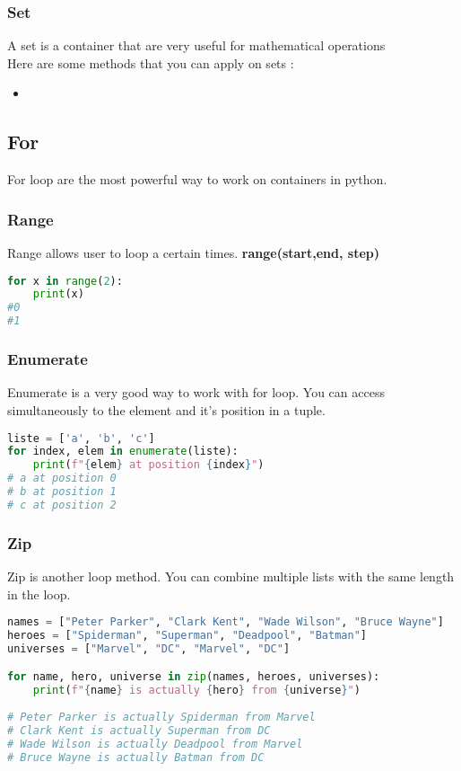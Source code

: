 \documentclass[a4paper, 12pt]{article}
\begin{document}
\subsubsection{Set}
A set is a container that are very useful for mathematical operations\\
Here are some methods that you can apply on sets : 
\begin{itemize}
\item
\end{itemize}

\newpage
\subsection{For}
\label{subsec:For}
For loop are the most powerful way to work on containers in python.

\subsubsection{Range}
Range allows user to loop a certain times. \textbf{range(start,end, step)}
\begin{lstlisting}[language=Python]
for x in range(2):
	print(x)
#0
#1
\end{lstlisting}

\subsubsection{Enumerate}
Enumerate is a very good way to work with for loop. You can access simultaneously to the element and it's position in a tuple.
\begin{lstlisting}[language=Python]
liste = ['a', 'b', 'c']
for index, elem in enumerate(liste):
	print(f"{elem} at position {index}")
# a at position 0
# b at position 1
# c at position 2
\end{lstlisting}

\subsubsection{Zip}
Zip is another loop method. You can combine multiple lists with the same length in the loop. 
\begin{lstlisting}[language=Python]
names = ["Peter Parker", "Clark Kent", "Wade Wilson", "Bruce Wayne"]
heroes = ["Spiderman", "Superman", "Deadpool", "Batman"]
universes = ["Marvel", "DC", "Marvel", "DC"]

for name, hero, universe in zip(names, heroes, universes):
	print(f"{name} is actually {hero} from {universe}")
	
# Peter Parker is actually Spiderman from Marvel
# Clark Kent is actually Superman from DC
# Wade Wilson is actually Deadpool from Marvel
# Bruce Wayne is actually Batman from DC
\end{lstlisting}
\end{document}
